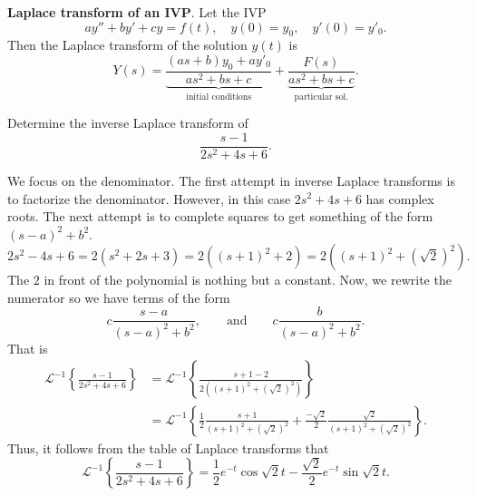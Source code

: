 \documentclass[11pt]{article}
\begin{document}
\begin{preamble}
\begin{formulaitem}
\item \textbf{Laplace transform of an IVP}. Let the IVP
\[ay''+by' +cy = f(t),\quad y(0)=y_{0}, \quad y'(0)=y'_{0}.\]
Then the Laplace transform of the solution $y(t)$ is
\[Y(s)= \underbrace{\frac{(as+b)y_{0}+ay'_{0}}{as^{2}+bs+c}}_{\text{initial conditions}}+\underbrace{\frac{F(s)}{as^{2}+bs+c}}_{\text{particular sol.}}.\]

\end{formulaitem}


\end{preamble}

\newpage




\begin{problem}
Determine the inverse Laplace transform of
\[\frac{s-1}{2s^{2}+4s+6}.\]
\end{problem}
\begin{solution}
We focus on the denominator. The first attempt in inverse Laplace transforms is to factorize the denominator. However, in this case $2s^{2}+4s+6$ has complex roots. The next attempt is to complete squares to get something of the form $(s-a)^{2}+b^{2}$.
\[2s^{2}-4s +6 = 2(s^{2}+2s+3)=2((s+1)^{2}+2)=2((s+1)^{2}+(\sqrt{2})^{2}).\]
The $2$ in front of the polynomial is nothing but a constant. 
Now, we rewrite the numerator so we have terms of the form \[c\frac{s-a}{(s-a)^{2}+b^{2}},\qquad\text{and}\qquad c\frac{b}{(s-a)^{2}+b^{2}}.\]
That is
\begin{align*}
\mathcal{L}^{-1}\left\{\frac{s-1}{2s^{2}+4s+6}\right\}&= \mathcal{L}^{-1}\left\{\frac{s+1-2}{2((s+1)^{2}+(\sqrt{2})^{2})}\right\}\\
&=\mathcal{L}^{-1}\left\{\frac{1}{2}\frac{s+1}{(s+1)^{2}+(\sqrt{2})^{2}}+ \frac{-\sqrt{2}}{2}\frac{\sqrt{2}}{(s+1)^{2}+(\sqrt{2})^{2}}\right\}.
\end{align*}
Thus, it follows from the table of Laplace transforms that
\[\boxed{\mathcal{L}^{-1}\left\{\frac{s-1}{2s^{2}+4s+6}\right\}=\frac{1}{2}e^{-t}\cos\sqrt{2}t-\frac{\sqrt{2}}{2}e^{-t}\sin\sqrt{2}t}.\]
\end{solution}
\end{document}
